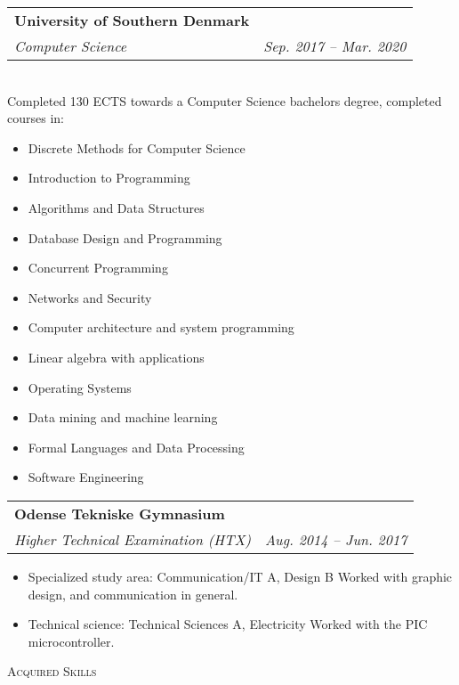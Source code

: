 \documentclass[11pt]{article}
\makeatletter
\newcommand{\resumeSubheading}[4]{
  \noindent\begin{tabular*}{0.98\textwidth}[t]{l@{\extracolsep{\fill}}r}
    \noindent \textbf{#1} & #2 \\ \vspace{-3pt} 
    \noindent \textit{\small#3} & \textit{\small #4} 
  \end{tabular*}\vspace{7pt}
}
\makeatother
\begin{document}
\vspace{0.3cm}

\resumeSubheading{University of Southern Denmark}{}{Computer Science}{Sep. 2017
-- Mar. 2020}\\\vspace{0.25cm} 
{\indent\small Completed 130 ECTS towards a Computer Science bachelors degree,
completed courses in:}
  \vspace{-0.3cm}
  {\footnotesize 
  \begin{itemize}
  \setlength{\itemsep}{-1pt}
    \item Discrete Methods for Computer Science
    \item Introduction to Programming
    \item Algorithms and Data Structures
    \item Database Design and Programming
    \item Concurrent Programming
    \item Networks and Security
    \item Computer architecture and system programming
    \item Linear algebra with applications
    \item Operating Systems
    \item Data mining and machine learning
    \item Formal Languages and Data Processing
    \item Software Engineering
\end{itemize}}
\vspace{0.3cm}

\resumeSubheading{Odense Tekniske Gymnasium}{}{Higher Technical
Examination (HTX)}{Aug. 2014 -- Jun. 2017}
{\small \begin{itemize}\vspace{-0.25cm}
  \setlength{\itemsep}{-1pt}
  \item Specialized study area: Communication/IT A, Design B
    \subitem Worked with graphic design, and communication in general.

  \item Technical science: Technical Sciences A, Electricity
    \subitem\footnotesize Worked with the PIC microcontroller.
\end{itemize}
} \vspace{0.5cm}

\newpage
\noindent\large{\scshape{Acquired Skills}} \newline
\noindent{\rule[0.3cm]{\textwidth}{0.4pt}}
\end{document}

